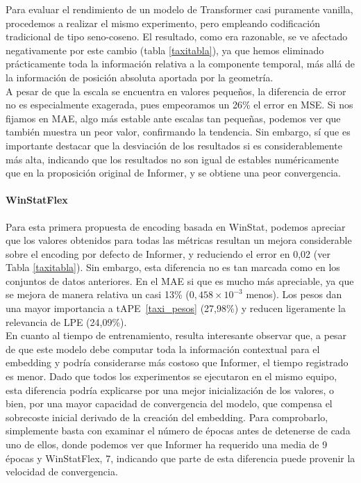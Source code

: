 Para evaluar el rendimiento de un modelo de Transformer casi puramente vanilla, procedemos a realizar el mismo experimento, pero empleando codificación tradicional de tipo seno-coseno. El resultado, como era razonable, se ve afectado negativamente por este cambio (tabla \ref{taxitabla}), ya que hemos eliminado prácticamente toda la información relativa a la componente temporal, más allá de la información de posición absoluta aportada por la geometría.\\

A pesar de que la escala se encuentra en valores pequeños, la diferencia de error no es especialmente exagerada, pues empeoramos un 26\% el error en MSE. Si nos fijamos en MAE, algo más estable ante escalas tan pequeñas, podemos ver que también muestra un peor valor, confirmando la tendencia. Sin embargo, sí que es importante destacar que la desviación de los resultados si es considerablemente más alta, indicando que los resultados no son igual de estables numéricamente que en la proposición original de Informer, y se obtiene una peor convergencia.\\

\paragraph{WinStatFlex}

Para esta primera propuesta de encoding basada en WinStat, podemos apreciar que los valores obtenidos para todas las métricas resultan un mejora considerable sobre el encoding por defecto de Informer, y reduciendo el error en 0,02 (ver Tabla \ref{taxitabla}). Sin embargo, esta diferencia no es tan marcada como en los conjuntos de datos anteriores. En el MAE si que es mucho más apreciable, ya que se mejora de manera relativa un casi 13\% ($0,458 \times 10^{-3}$ menos). Los pesos dan una mayor importancia a tAPE~\ref{taxi_pesos} (27,98\%) y reducen ligeramente la relevancia de LPE (24,09\%).\\ 

En cuanto al tiempo de entrenamiento, resulta interesante observar que, a pesar de que este modelo debe computar toda la información contextual para el embedding y podría considerarse más costoso que Informer, el tiempo registrado es menor. Dado que todos los experimentos se ejecutaron en el mismo equipo, esta diferencia podría explicarse por una mejor inicialización de los valores, o bien, por una mayor capacidad de convergencia del modelo, que compensa el sobrecoste inicial derivado de la creación del embedding. Para comprobarlo, simplemente basta con examinar el número de épocas antes de detenerse de cada uno de ellos, donde podemos ver que Informer ha requerido una media de 9 épocas y WinStatFlex, 7, indicando que parte de esta diferencia puede provenir la velocidad de convergencia. 

